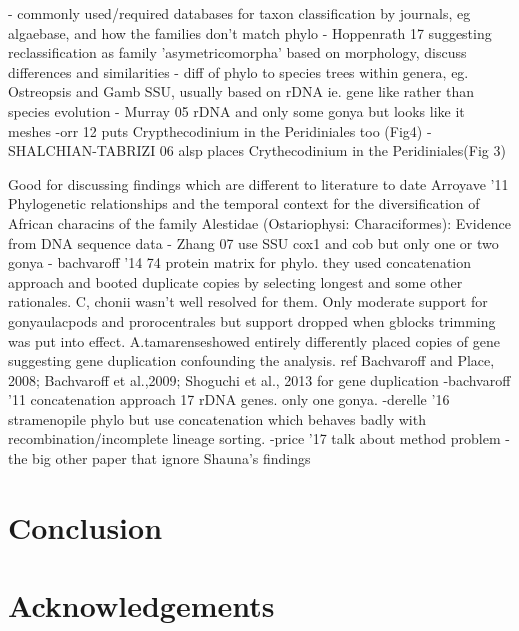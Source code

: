 \documentclass[12pt]{article}
\begin{document}
- commonly used/required databases for taxon classification by journals, eg algaebase, and how the families don't match phylo
- Hoppenrath 17 suggesting reclassification as family 'asymetricomorpha' based on morphology, discuss differences and similarities
- diff of phylo to species trees within genera, eg. Ostreopsis and Gamb SSU, usually based on rDNA ie. gene like rather than species evolution
- Murray 05 \cite{murray2005improving} rDNA and only some gonya but looks like it meshes
 -orr 12 \cite{orr2012naked} puts Crypthecodinium in the Peridiniales too (Fig4)
 - SHALCHIAN-TABRIZI 06 \cite{shalchian2006combined} alsp places Crythecodinium in the Peridiniales(Fig 3)

Good for discussing findings which are different to literature to date Arroyave '11 Phylogenetic relationships and the temporal context for the diversification
of African characins of the family Alestidae (Ostariophysi: Characiformes): Evidence from DNA sequence data
- Zhang 07 use SSU cox1 and cob but only one or two gonya
- bachvaroff '14 74 protein matrix for phylo. they used concatenation approach and booted duplicate copies by selecting longest and some other rationales. C, chonii wasn't well resolved for them. Only moderate support for gonyaulacpods and prorocentrales but support dropped when gblocks trimming was put into effect. A.tamarenseshowed entirely differently placed copies of gene suggesting gene duplication confounding the analysis.  ref Bachvaroff and Place, 2008; Bachvaroff et al.,2009; Shoguchi et al., 2013 for gene duplication
-bachvaroff '11 concatenation approach 17 rDNA genes. only one gonya.
-derelle '16 stramenopile phylo but use concatenation which behaves badly with recombination/incomplete lineage sorting.
-price '17 talk about method problem
- the big other paper that ignore Shauna's findings





\newpage
\section{Conclusion}
\newpage

\section{Acknowledgements}


\end{document}
